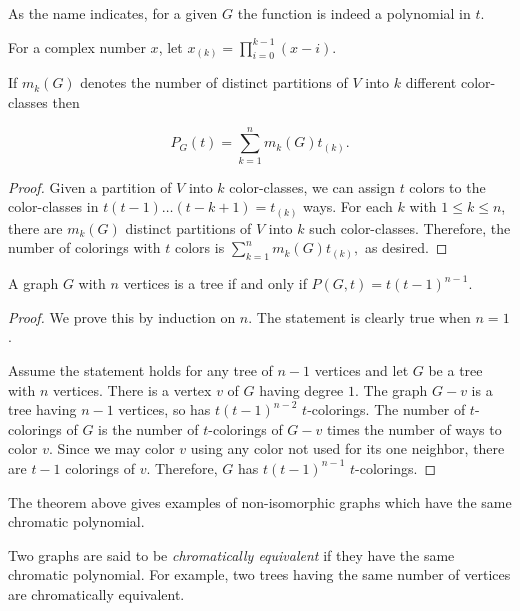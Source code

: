 As the name indicates, for a given $G$ the function is indeed a 
polynomial in $t$.

For a complex number $x$, let $x_{(k)}=\prod_{i=0}^{k-1} (x-i)$.

\begin{lemma}
If $m_k(G)$ denotes the number of distinct partitions of $V$
into $k$ different color-classes then

\[
P_G(t) = \sum_{k=1}^n m_k(G)t_{(k)}.
\]
\end{lemma}


\begin{proof}
Given a partition of $V$ into $k$ color-classes, we can assign 
$t$ colors to the color-classes in $t(t-1)\dots (t-k+1)=t_{(k)}$ ways.
For each $k$ with $1\leq k\leq n$, there are
$m_k(G)$ distinct partitions of $V$ into $k$ such color-classes.
Therefore, the number of colorings with $t$ colors is 
$ \sum_{k=1}^n m_k(G)t_{(k)},$ as desired.

\end{proof}



\begin{theorem}  
A graph $G$ with $n$ vertices is a tree if and only if $P(G, t) =
t(t-1)^{n-1}$.
\end{theorem}

\begin{proof}
We prove this by induction on $n$. The statement is clearly
true when $n=1$. 

Assume the statement holds for any tree of $n-1$ vertices
and let $G$ be a tree with $n$ vertices. There is a vertex $v$ 
of $G$ having degree $1$. The graph $G-v$ is a tree having $n-1$
vertices, so has $t(t-1)^{n-2}$ $t$-colorings. The number of 
$t$-colorings of $G$ is the number of $t$-colorings of $G-v$ times the
number of ways to color $v$. Since we may color $v$ using any
color not used for its one neighbor, there are $t-1$ colorings of $v$.
Therefore, $G$ has $t(t-1)^{n-1}$ $t$-colorings. 

\end{proof}

The theorem above gives examples of non-isomorphic graphs which have
the same chromatic polynomial.


Two graphs are said to be {\it chromatically equivalent} if they have the
same chromatic polynomial. For example, two trees having the same
number of vertices are chromatically equivalent.

